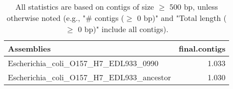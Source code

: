 \documentclass[12pt,a4paper]{article}
\begin{document}
\begin{table}[ht]
\begin{center}
\caption{All statistics are based on contigs of size $\geq$ 500 bp, unless otherwise noted (e.g., "\# contigs ($\geq$ 0 bp)" and "Total length ($\geq$ 0 bp)" include all contigs).}
\begin{tabular}{|l*{1}{|r}|}
\hline
Assemblies & final.contigs \\ \hline
Escherichia\_coli\_O157\_H7\_EDL933\_0990 & 1.033 \\ \hline
Escherichia\_coli\_O157\_H7\_EDL933\_ancestor & 1.030 \\ \hline
\end{tabular}
\end{center}
\end{table}
\end{document}
